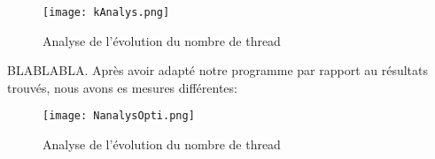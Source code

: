 \documentclass[11pt,a4paper]{article}
\begin{document}
\begin{figure}[ht!]
 \centering
 \texttt{[image: kAnalys.png]}
 \caption{Analyse de l'évolution du nombre de thread}
 \label{scheme1}
\end{figure}


BLABLABLA. Après avoir adapté notre programme par rapport au résultats trouvés, nous avons es mesures différentes:

\begin{figure}[ht!]
 \centering
 \texttt{[image: NanalysOpti.png]}
 \caption{Analyse de l'évolution du nombre de thread}
 \label{scheme1}
\end{figure}
\end{document}
